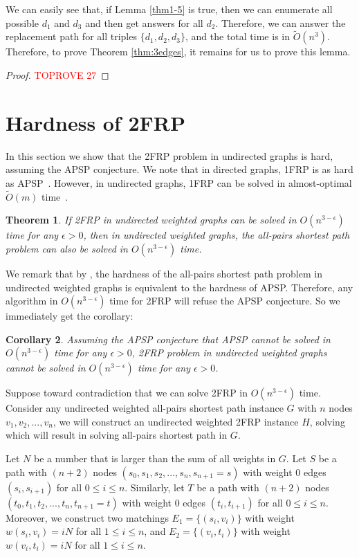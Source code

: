 \documentclass[11pt]{article}
\theoremstyle{plain}
\newtheorem{theorem}{Theorem}[section]
\newtheorem{corollary}[theorem]{Corollary}
\theoremstyle{definition}
\newcommand{\too}[1]{\tilde{O}({#1})}
\newcommand{\set}[1]{\{ #1 \}}
\begin{document}
We can easily see that, if Lemma \ref{thm1-5} is true, then we can enumerate all possible $d_1$ and $d_3$ and then get answers for all $d_2$. Therefore, we can answer the replacement path for all triples $\{d_1,d_2,d_3\}$, and the total time is in $\too{n^3}$. Therefore, to prove Theorem \ref{thm:3edges}, it remains for us to prove this lemma. 
 
\begin{proof}\textcolor{red}{TOPROVE 27}\end{proof} \section{Hardness of 2FRP}\label{sec:hardness}

In this section we show that the 2FRP problem in undirected graphs is hard, assuming the APSP conjecture. We note that in directed graphs, 1FRP is as hard as APSP~\cite{WW18}. However, in undirected graphs, 1FRP can be solved in almost-optimal $\tilde{O}(m)$ time~\cite{NPW01}. 

\begin{theorem}\label{theorem:2FRP}
    If 2FRP in undirected weighted graphs can be solved in $O(n^{3-\epsilon})$ time for any $\epsilon>0$, then in undirected weighted graphs, the all-pairs shortest path problem can also be solved in $O(n^{3-\epsilon})$ time.
\end{theorem}

We remark that by \cite{WW18}, the hardness of the all-pairs shortest path problem in undirected weighted graphs is equivalent to the hardness of APSP. Therefore, any algorithm in $O(n^{3-\epsilon})$ time for 2FRP will refuse the APSP conjecture. So we immediately get the corollary:

\begin{corollary}
    Assuming the APSP conjecture that APSP cannot be solved in $O(n^{3-\epsilon})$ time for any $\epsilon>0$, 2FRP problem in undirected weighted graphs cannot be solved in $O(n^{3-\epsilon})$ time for any $\epsilon>0$.
\end{corollary}

Suppose toward contradiction that we can solve 2FRP in $O(n^{3-\epsilon})$ time. Consider any undirected weighted all-pairs shortest path instance $G$ with $n$ nodes $v_1, v_2, ..., v_n$, we will construct an undirected weighted 2FRP instance $H$, solving which will result in solving all-pairs shortest path in $G$.

Let $N$ be a number that is larger than the sum of all weights in $G$. Let $S$ be a path with $(n+2)$ nodes {$(s_0,s_1,s_2,...,s_n,s_{n+1}=s)$} with weight 0 edges $(s_i,s_{i+1})$ for all $0 \leq i \leq n$. Similarly, let $T$ be a path with $(n+2)$ nodes $(t_0,t_1,t_2,...,t_n,t_{n+1}=t)$ with weight 0 edges $(t_i,t_{i+1})$ for all $0 \leq i \leq n$. Moreover, we construct two matchings $E_1 = \set{(s_i,v_i)}$ with weight $w(s_i,v_i)=iN$ for all $1 \leq i \leq n$, and $E_2 = \set{(v_i,t_i)}$ with weight $w(v_i,t_i)=iN$ for all $1 \leq i \leq n$.
\end{document}
